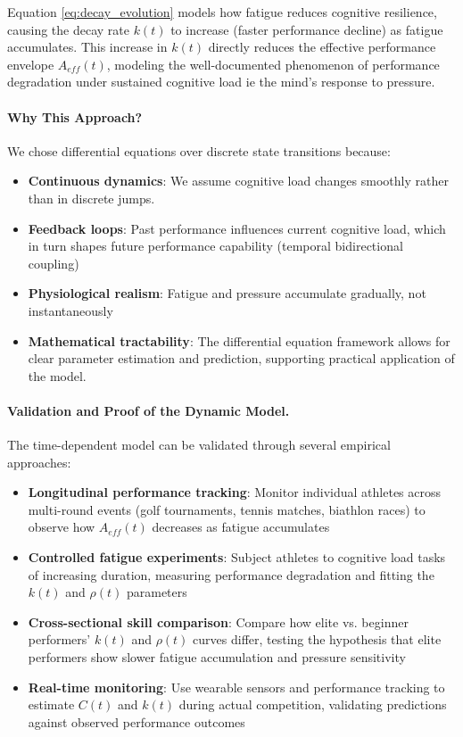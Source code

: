 \documentclass{article}
\begin{document}
Equation \eqref{eq:decay_evolution} models how fatigue reduces cognitive resilience, causing the decay rate $k(t)$ 
to increase (faster performance decline) as fatigue accumulates. This increase in $k(t)$ directly reduces the 
effective performance envelope $A_{eff}(t)$, modeling the well-documented phenomenon of performance degradation 
under sustained cognitive load ie the mind's response to pressure.

\paragraph{Why This Approach?} We chose differential equations over discrete state transitions because:
\begin{itemize}
    \item \textbf{Continuous dynamics}: We assume cognitive load changes smoothly rather than in discrete jumps.
    \item \textbf{Feedback loops}: Past performance influences current cognitive load, which in turn shapes future
    performance capability (temporal bidirectional coupling)
    \item \textbf{Physiological realism}: Fatigue and pressure accumulate gradually, not instantaneously
    \item \textbf{Mathematical tractability}: The differential equation framework allows for clear parameter estimation
    and prediction, supporting practical application of the model.
\end{itemize}

\paragraph{Validation and Proof of the Dynamic Model.} The time-dependent model can be validated through several 
empirical approaches:

\begin{itemize}
    \item \textbf{Longitudinal performance tracking}: Monitor individual athletes across multi-round events 
    (golf tournaments, tennis matches, biathlon races) to observe how $A_{eff}(t)$ decreases as fatigue accumulates
    
    \item \textbf{Controlled fatigue experiments}: Subject athletes to cognitive load tasks of increasing duration, 
    measuring performance degradation and fitting the $k(t)$ and $\rho(t)$ parameters
    
    \item \textbf{Cross-sectional skill comparison}: Compare how elite vs. beginner performers' $k(t)$ and $\rho(t)$ 
    curves differ, testing the hypothesis that elite performers show slower fatigue accumulation and pressure sensitivity
    
    \item \textbf{Real-time monitoring}: Use wearable sensors and performance tracking to estimate $C(t)$ and $k(t)$ 
    during actual competition, validating predictions against observed performance outcomes
\end{itemize}
\end{document}
